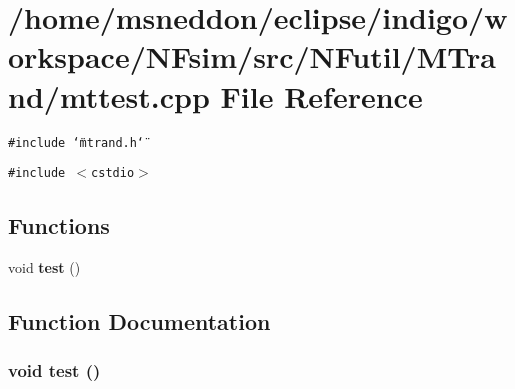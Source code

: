 \section{/home/msneddon/eclipse/indigo/workspace/NFsim/src/NFutil/MTrand/mttest.cpp File Reference}
\label{mttest_8cpp}


{\tt \#include \char`\"{}mtrand.h\char`\"{}}\par
{\tt \#include $<$cstdio$>$}\par
\subsection*{Functions}
\begin{CompactItemize}
\item 
void {\bf test} ()
\end{CompactItemize}


\subsection{Function Documentation}
\subsubsection{\setlength{\rightskip}{0pt plus 5cm}void test ()}\label{mttest_8cpp_e1a3968e7947464bee7714f6d43b7002}


